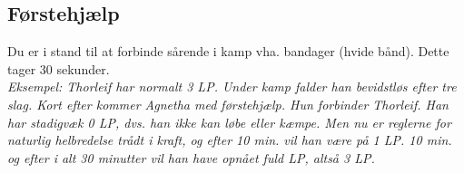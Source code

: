 \subsection{Førstehjælp}
Du er i stand til at forbinde sårende i kamp vha. bandager (hvide bånd). Dette tager 30 sekunder.\\
\textit{Eksempel: Thorleif har normalt 3 LP. Under kamp falder han bevidstløs efter tre slag. Kort efter kommer Agnetha med førstehjælp. Hun forbinder Thorleif. Han har stadigvæk 0 LP, dvs. han ikke kan løbe eller kæmpe. Men nu er reglerne for naturlig helbredelse trådt i kraft, og efter 10 min. vil han være på 1 LP. 10 min. og efter i alt 30 minutter vil han have opnået fuld LP, altså 3 LP.}